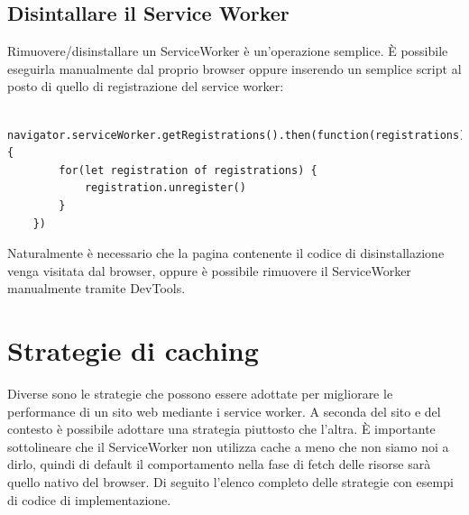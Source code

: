 \documentclass[11pt ,a4paper , twoside , openright ]{article}
\begin{document}
\subsection{Disintallare il Service Worker}

Rimuovere/disinstallare un ServiceWorker è un’operazione semplice. È possibile eseguirla manualmente dal proprio browser oppure inserendo un semplice script al posto di quello di registrazione del service worker:

\begin{lstlisting}
	navigator.serviceWorker.getRegistrations().then(function(registrations) { 		
		for(let registration of registrations) { 
			registration.unregister() 
		}
	})
\end{lstlisting}

Naturalmente è necessario che la pagina contenente il codice di disinstallazione venga visitata dal browser, oppure è possibile rimuovere il ServiceWorker manualmente tramite DevTools.
\newpage
\section{Strategie di caching}
Diverse sono le strategie che possono essere adottate per migliorare le performance di un sito web mediante i service worker. A seconda del sito e del contesto è possibile adottare una strategia piuttosto che l’altra.
È importante sottolineare che il ServiceWorker non utilizza cache a meno che non siamo noi a dirlo, quindi di default il comportamento nella fase di fetch delle risorse sarà quello nativo del browser.
Di seguito l’elenco completo delle strategie con esempi di codice di implementazione. 
\end{document}
